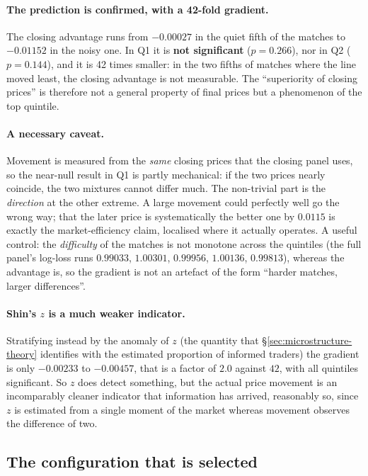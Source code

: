\documentclass[12pt,a4paper,oneside]{report}
\renewcommand{\_}{\oldunderscore\allowbreak}
\theoremstyle{definition}
\theoremstyle{plain}
\theoremstyle{definition}   %
\begin{document}
\paragraph{The prediction is confirmed, with a 42-fold gradient.} The closing advantage runs from
$-0.00027$ in the quiet fifth of the matches to $-0.01152$ in the noisy one. In Q1 it is
\textbf{not significant} ($p=0.266$), nor in Q2 ($p=0.144$), and it is 42 times smaller: in the
two fifths of matches where the line moved least, the closing advantage is not measurable. The ``superiority of closing prices'' is
therefore not a general property of final prices but a phenomenon of the top quintile.

\paragraph{A necessary caveat.} Movement is measured from the \emph{same} closing prices that the
closing panel uses, so the near-null result in Q1 is partly mechanical: if the two prices nearly
coincide, the two mixtures cannot differ much. The non-trivial part is the \emph{direction} at
the other extreme. A large movement could perfectly well go the wrong way; that the later price
is systematically the better one by $0.0115$ is exactly the market-efficiency claim, localised
where it actually operates. A useful control: the \emph{difficulty} of the matches is not
monotone across the quintiles (the full panel's log-loss runs $0.99033$, $1.00301$, $0.99956$,
$1.00136$, $0.99813$), whereas the advantage is, so the gradient is not an artefact of the form
``harder matches, larger differences''.

\paragraph{Shin's $z$ is a much weaker indicator.} Stratifying instead by the anomaly of $z$
(the quantity that \S\ref{sec:microstructure-theory} identifies with the estimated proportion
of informed traders) the gradient is only $-0.00233$ to $-0.00457$, that is a factor of $2.0$
against $42$, with all quintiles significant. So $z$ does detect something, but the actual
price movement is an incomparably cleaner indicator that information has arrived, reasonably
so, since $z$ is estimated from a single moment of the market whereas movement observes the
difference of two.

\subsection{The configuration that is selected}
\label{sec:res-config}
\end{document}
